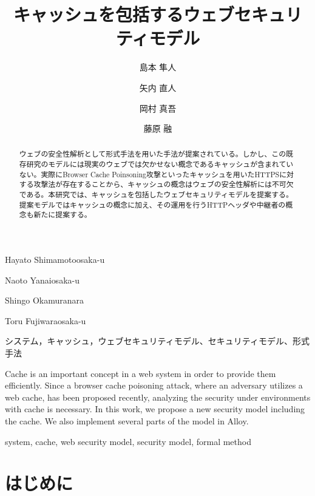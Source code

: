 \documentclass{css}
\begin{document}
\title{キャッシュを包括するウェブセキュリティモデル}


\author{島本 隼人}{Hayato Shimamoto}{osaka-u}
\author{矢内 直人}{Naoto Yanai}{osaka-u}
\author{岡村 真吾}{Shingo Okamura}{nara}
\author{藤原 融}{Toru Fujiwara}{osaka-u}


\begin{abstract}
ウェブの安全性解析として形式手法を用いた手法が提案されている。しかし、この既存研究のモデルには現実のウェブでは欠かせない概念であるキャッシュが含まれていない。実際にBrowser Cache Poinsoning攻撃といったキャッシュを用いたHTTPSに対する攻撃法が存在することから、キャッシュの概念はウェブの安全性解析には不可欠である。本研究では、キャッシュを包括したウェブセキュリティモデルを提案する。提案モデルではキャッシュの概念に加え、その運用を行うHTTPヘッダや中継者の概念も新たに提案する。
\end{abstract}

\begin{jkeyword}
システム，キャッシュ，ウェブセキュリティモデル、セキュリティモデル、形式手法
\end{jkeyword}

\begin{eabstract}
Cache is an important concept in a web system in order to provide them efficiently. Since a browser cache poisoning attack, where an adversary utilizes a web cache, has been proposed recently, analyzing the security under environments with cache is necessary. In this work, we propose a new security model including the cache. We also implement several parts of the model in Alloy.
\end{eabstract}

\begin{ekeyword}
system, cache, web security model, security model, formal method
\end{ekeyword}

\maketitle

\section{はじめに}
\end{document}
